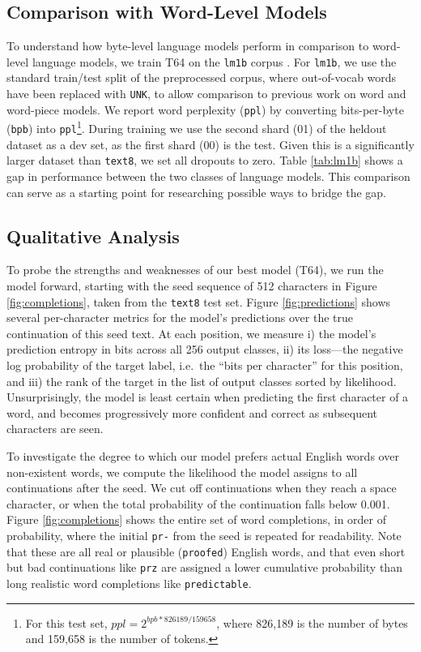 \subsection{Comparison with Word-Level Models} To understand how byte-level language models perform in comparison to word-level language models, we train \textsc{T64} on the \texttt{lm1b} corpus \cite{chelba2013one}. For \texttt{lm1b}, we use the standard train/test split of the preprocessed corpus, where out-of-vocab words have been replaced with \texttt{UNK}, to allow comparison to previous work on word and word-piece models. We report word perplexity (\texttt{ppl}) by converting bits-per-byte (\texttt{bpb}) into \texttt{ppl}\footnote{For this test set, $ppl = 2 ^ {bpb * 826189 / 159658}$, where 826,189 is the number of bytes and 159,658 is the number of tokens.}. During training we use the second shard (01) of the heldout dataset as a dev set, as the first shard (00) is the test. Given this is a significantly larger dataset than \texttt{text8}, we set all dropouts to zero. Table \ref{tab:lm1b} shows a gap in performance between the two classes of language models. This comparison can serve as a starting point for researching possible ways to bridge the gap.

\subsection{Qualitative Analysis}

To probe the strengths and weaknesses of our best model (\textsc{T64}), we run the model forward, starting with the seed sequence of 512 characters in Figure \ref{fig:completions}, taken from the \texttt{text8} test set. Figure \ref{fig:predictions} shows several per-character metrics for the model's predictions over the true continuation of this seed text. At each position, we measure i) the model's prediction entropy in bits across all 256 output classes, ii) its loss---the negative log probability of the target label, i.e.~the ``bits per character'' for this position, and iii) the rank of the target in the list of output classes sorted by likelihood. Unsurprisingly, the model is least certain when predicting the first character of a word, and becomes progressively more confident and correct as subsequent characters are seen.

To investigate the degree to which our model prefers actual English words over non-existent words, we compute the likelihood the model assigns to all continuations after the seed. We cut off continuations when they reach a space character, or when the total probability of the continuation falls below 0.001. Figure \ref{fig:completions} shows the entire set of word completions, in order of probability, where the initial \texttt{pr-} from the seed is repeated for readability. Note that these are all real or plausible (\texttt{proofed}) English words, and that even short but bad continuations like \texttt{prz} are assigned a lower cumulative probability than long realistic word completions like \texttt{predictable}.

